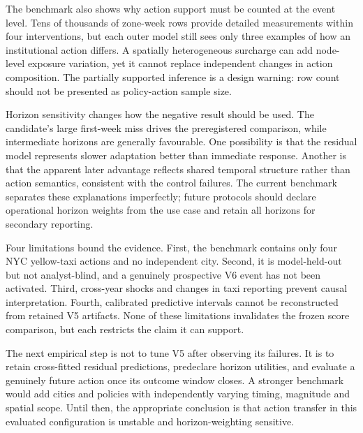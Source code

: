 \documentclass{nature}
\begin{document}
The benchmark also shows why action support must be counted at the event level. Tens of thousands of zone-week rows provide detailed measurements within four interventions, but each outer model still sees only three examples of how an institutional action differs. A spatially heterogeneous surcharge can add node-level exposure variation, yet it cannot replace independent changes in action composition. The partially supported inference is a design warning: row count should not be presented as policy-action sample size.

Horizon sensitivity changes how the negative result should be used. The candidate's large first-week miss drives the preregistered comparison, while intermediate horizons are generally favourable. One possibility is that the residual model represents slower adaptation better than immediate response. Another is that the apparent later advantage reflects shared temporal structure rather than action semantics, consistent with the control failures. The current benchmark separates these explanations imperfectly; future protocols should declare operational horizon weights from the use case and retain all horizons for secondary reporting.

Four limitations bound the evidence. First, the benchmark contains only four NYC yellow-taxi actions and no independent city. Second, it is model-held-out but not analyst-blind, and a genuinely prospective V6 event has not been activated. Third, cross-year shocks and changes in taxi reporting prevent causal interpretation. Fourth, calibrated predictive intervals cannot be reconstructed from retained V5 artifacts. None of these limitations invalidates the frozen score comparison, but each restricts the claim it can support.

The next empirical step is not to tune V5 after observing its failures. It is to retain cross-fitted residual predictions, predeclare horizon utilities, and evaluate a genuinely future action once its outcome window closes. A stronger benchmark would add cities and policies with independently varying timing, magnitude and spatial scope. Until then, the appropriate conclusion is that action transfer in this evaluated configuration is unstable and horizon-weighting sensitive.
\end{document}
